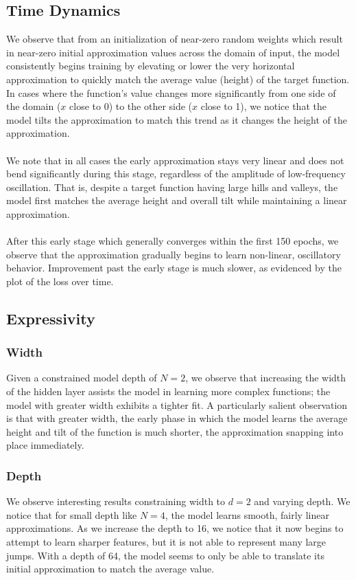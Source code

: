 \documentclass[11pt]{article}
\begin{document}
\subsection{Time Dynamics}
We observe that from an initialization of near-zero random weights which result in near-zero initial approximation values across the domain of input, the model consistently begins training by elevating or lower the very horizontal approximation to quickly match the average value (height) of the target function. In cases where the function's value changes more significantly from one side of the domain ($x$ close to 0) to the other side ($x$ close to 1), we notice that the model tilts the approximation to match this trend as it changes the height of the approximation.
\\\\
We note that in all cases the early approximation stays very linear and does not bend significantly during this stage, regardless of the amplitude of low-frequency oscillation. That is, despite a target function having large hills and valleys, the model first matches the average height and overall tilt while maintaining a linear approximation.
\\\\
After this early stage which generally converges within the first 150 epochs, we observe that the approximation gradually begins to learn non-linear, oscillatory behavior. Improvement past the early stage is much slower, as evidenced by the plot of the loss over time.

\subsection{Expressivity}

\subsubsection{Width}
Given a constrained model depth of $N = 2$, we observe that increasing the width of the hidden layer assists the model in learning more complex functions; the model with greater width exhibits a tighter fit. A particularly salient observation is that with greater width, the early phase in which the model learns the average height and tilt of the function is much shorter, the approximation snapping into place immediately.
\subsubsection{Depth}
We observe interesting results constraining width to $d = 2$ and varying depth. We notice that for small depth like $N = 4$, the model learns smooth, fairly linear approximations. As we increase the depth to 16, we notice that it now begins to attempt to learn sharper features, but it is not able to represent many large jumps. With a depth of 64, the model seems to only be able to translate its initial approximation to match the average value.
\end{document}
